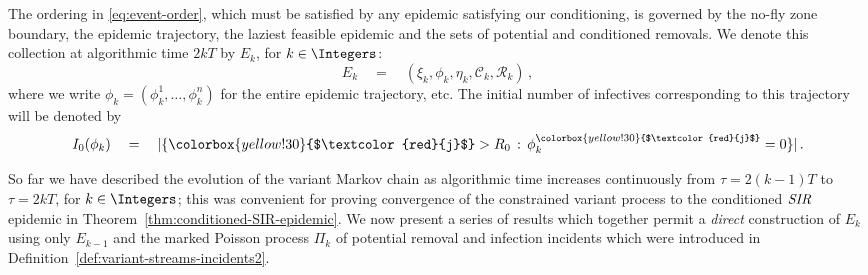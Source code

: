 \documentclass[]{article}
\newcommand{\Conditioned}{\mathcal{C}}
\newcommand{\Epidemic}{E}%
\newcommand{\Removals}{\mathcal{R}}
\newcommand{\SIR}{\emph{SIR}\xspace}
\newcommand{\Poisson}{\Pi}
\newcommand{\infectee}{{\colorbox{yellow!30}{$\textcolor{red}{j}$}}}
\begin{document}
The ordering in \eqref{eq:event-order}, which must be satisfied by any epidemic satisfying our conditioning, 
is governed by the no-fly zone boundary, the epidemic trajectory,
the laziest feasible epidemic and the sets of potential and conditioned removals.
We denote this collection at algorithmic time \(2kT\) by \(\Epidemic_k\), for \(k\in\Integers\):
 \[
 \Epidemic_k \quad=\quad (\xi_k, \phi_k, \eta_k, \Conditioned_k, \Removals_k) \,,
 \]
where we write \(\phi_k = (\phi^1_k, \dots, \phi^n_k)\) for the entire epidemic trajectory, etc. The initial number of infectives corresponding to this trajectory will be denoted by 
\[
	I_0(\phi_k) \quad=\quad |\{\infectee>R_0\,:\, \phi_k^\infectee = 0\}|  \,.
\]

So far we have described the evolution of the variant Markov chain 
as algorithmic time increases continuously from \(\tau=2(k{-}1)T\) to \(\tau = 2kT\), for \(k\in\Integers\); this was convenient for proving convergence of the constrained variant process to the conditioned \(\SIR\) epidemic in Theorem~\ref{thm:conditioned-SIR-epidemic}. We now present a series of results which together permit a \emph{direct} 
construction of \(\Epidemic_k\) using only \(\Epidemic_{k-1}\) 
and the marked Poisson process \(\Poisson_k\) of potential removal and infection incidents which were introduced in Definition~\ref{def:variant-streams-incidents2}.
\end{document}
